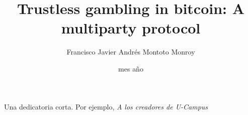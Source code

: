 \documentclass[upright, contnum]{umemoria}
\author{Francisco Javier Andr\'es Montoto Monroy}
\title{Trustless gambling in bitcoin: A multiparty protocol}
\date{mes {a\~no}}
\begin{document}
\begin{otherlanguage}{spanish}
\frontmatter
\maketitle
\end{otherlanguage}
\begin{otherlanguage}{english}
\begin{abstract}

\end{abstract}


\begin{dedicatoria} %
Una dedicatoria corta. Por ejemplo, \emph{A los creadores de U-Campus}
\end{dedicatoria}

\begin{thanks} %
\lipsum[1-2]
\end{thanks}
\cleardoublepage

\tableofcontents
\listoftables %
\listoffigures %

\mainmatter






\printbibliography
\end{otherlanguage}
\end{document}
